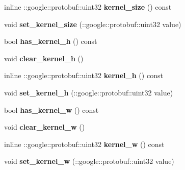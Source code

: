 \begin{DoxyCompactItemize}
inline \+::google\+::protobuf\+::uint32 {\bfseries kernel\+\_\+size} () const
\item 
\mbox{\label{classcaffe_1_1_pooling_parameter_ac47691dcbad4ca3b9378720a84e7bb5b}} 
void {\bfseries set\+\_\+kernel\+\_\+size} (\+::google\+::protobuf\+::uint32 value)
\item 
\mbox{\label{classcaffe_1_1_pooling_parameter_a3126010b7abec5174048f6ee3840071d}} 
bool {\bfseries has\+\_\+kernel\+\_\+h} () const
\item 
\mbox{\label{classcaffe_1_1_pooling_parameter_a044ce0120434a09f2ceab60de80230b1}} 
void {\bfseries clear\+\_\+kernel\+\_\+h} ()
\item 
\mbox{\label{classcaffe_1_1_pooling_parameter_a00383c0cea2d5ff1017732a9e975f66f}} 
inline \+::google\+::protobuf\+::uint32 {\bfseries kernel\+\_\+h} () const
\item 
\mbox{\label{classcaffe_1_1_pooling_parameter_ad3deaf7ea415cf8184ad233d93138c49}} 
void {\bfseries set\+\_\+kernel\+\_\+h} (\+::google\+::protobuf\+::uint32 value)
\item 
\mbox{\label{classcaffe_1_1_pooling_parameter_ac169f3fe257ae463facb630e65a127e2}} 
bool {\bfseries has\+\_\+kernel\+\_\+w} () const
\item 
\mbox{\label{classcaffe_1_1_pooling_parameter_a8fc044de2abf17f7dc43cd9f1453fd1b}} 
void {\bfseries clear\+\_\+kernel\+\_\+w} ()
\item 
\mbox{\label{classcaffe_1_1_pooling_parameter_a8deb594cdd03d886a699e4c95dffb9d9}} 
inline \+::google\+::protobuf\+::uint32 {\bfseries kernel\+\_\+w} () const
\item 
\mbox{\label{classcaffe_1_1_pooling_parameter_a419df15efb63bf411bb51977aad5b5a3}} 
void {\bfseries set\+\_\+kernel\+\_\+w} (\+::google\+::protobuf\+::uint32 value)
\item 
\mbox{\label{classcaffe_1_1_pooling_parameter_afe114d4d002f4245feb698a3bd9b85c6}} 

\end{DoxyCompactItemize}

